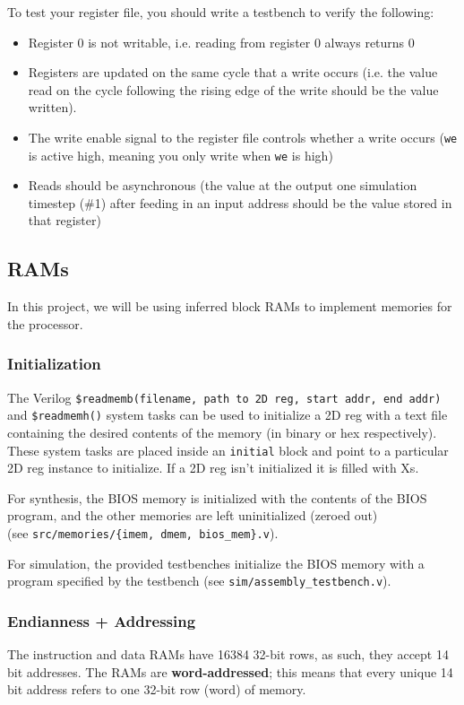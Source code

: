 \documentclass[11pt]{article}
\begin{document}
To test your register file, you should write a testbench to verify the following:
\begin{itemize}
  \item Register 0 is not writable, i.e. reading from register 0 always returns 0
  \item Registers are updated on the same cycle that a write occurs (i.e. the value read on the cycle following the rising edge of the write should be the value written).
  \item The write enable signal to the register file controls whether a write occurs (\verb|we| is active high, meaning you only write when \verb|we| is high)
  \item Reads should be asynchronous (the value at the output one simulation timestep (\#1) after feeding in an input address should be the value stored in that register)
\end{itemize}

\subsection{RAMs}
\label{ram_info}
In this project, we will be using inferred block RAMs to implement memories for the processor.

\subsubsection{Initialization}
The Verilog \verb|$readmemb(filename, path to 2D reg, start addr, end addr)| and \verb|$readmemh()| system tasks can be used to initialize a 2D reg with a text file containing the desired contents of the memory (in binary or hex respectively).
These system tasks are placed inside an \verb|initial| block and point to a particular 2D reg instance to initialize.
If a 2D reg isn't initialized it is filled with Xs.

For synthesis, the BIOS memory is initialized with the contents of the BIOS program, and the other memories are left uninitialized (zeroed out)\\
(see \verb|src/memories/{imem, dmem, bios_mem}.v|).

For simulation, the provided testbenches initialize the BIOS memory with a program specified by the testbench (see \verb|sim/assembly_testbench.v|).

\subsubsection{Endianness + Addressing}
The instruction and data RAMs have 16384 32-bit rows, as such, they accept 14 bit addresses.
The RAMs are \textbf{word-addressed}; this means that every unique 14 bit address refers to one 32-bit row (word) of memory.
\end{document}
